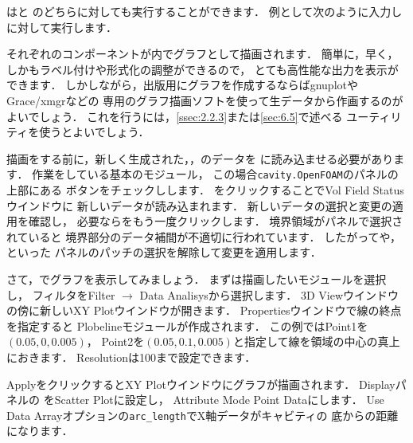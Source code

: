 はと
のどちらに対しても実行することができます．
例として次のように入力しに対して実行します．
それぞれのコンポーネントが内でグラフとして描画されます．
簡単に，早く，しかもラベル付けや形式化の調整ができるので，
とても高性能な出力を表示ができます．
しかしながら，出版用にグラフを作成するならばgnuplotやGrace/xmgrなどの
専用のグラフ描画ソフトを使って生データから作画するのがよいでしょう．
これを行うには，\autoref{ssec:2.2.3}または\autoref{sec:6.5}で述べる
ユーティリティを使うとよいでしょう．

描画をする前に，新しく生成された，，のデータを
に読み込ませる必要があります．
作業をしている基本のモジュール，
この場合\texttt{cavity.OpenFOAM}のパネルの上部にある
ボタンをチェックしします．
をクリックすることでVol Field Statusウインドウに
新しいデータが読み込まれます．
新しいデータの選択と変更の適用を確認し，
必要ならをもう一度クリックします．
境界領域がパネルで選択されていると
境界部分のデータ補間が不適切に行われています．
したがってや，といった
パネルのパッチの選択を解除して変更を適用します．

さて，でグラフを表示してみましょう．
まずは描画したいモジュールを選択し，
%
%
フィルタをFilter $\rightarrow$ Data Analisysから選択します．
3D Viewウインドウの傍に新しいXY Plotウインドウが開きます．
Propertiesウインドウで線の終点を指定すると
Plobelineモジュールが作成されます．
この例ではPoint1を$(0.05, 0, 0.005)$，
Point2を$(0.05, 0.1, 0.005)$と指定して線を領域の中心の真上におきます．
Resolutionは100まで設定できます．

ApplyをクリックするとXY Plotウインドウにグラフが描画されます．
Displayパネルの
%
%
をScatter Plotに設定し，
Attribute Mode Point Dataにします．
Use Data Arrayオプションの\verb|arc_length|でX軸データがキャビティの
底からの距離になります．


